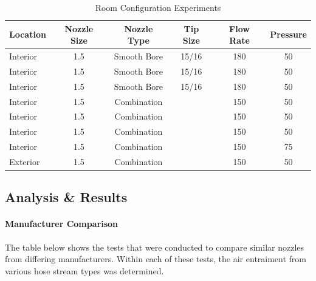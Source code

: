 \documentclass{article}
\begin{document}
\begin{table}[!ht]
\centering
\begin{tabular}{|lccccc|}
\hline
\multicolumn{1}{|c|}{\textbf{Location}} & \multicolumn{1}{c|}{\textbf{Nozzle Size}} & \multicolumn{1}{c|}{\textbf{Nozzle Type}} & \multicolumn{1}{c|}{\textbf{Tip Size}} & \multicolumn{1}{c|}{\textbf{Flow Rate}} & \textbf{Pressure} \\ \hline
Interior & 1.5 & Smooth Bore & 15/16 & 180 & 50 \\
Interior & 1.5 & Smooth Bore & 15/16 & 180 & 50 \\
Interior & 1.5 & Smooth Bore & 15/16 & 180 & 50 \\
Interior & 1.5 & Combination &  & 150 & 50 \\
Interior & 1.5 & Combination &  & 150 & 50 \\
Interior & 1.5 & Combination &  & 150 & 50 \\
Interior & 1.5 & Combination &  & 150 & 75 \\
Exterior & 1.5 & Combination &  & 150 & 50 \\ \hline
\end{tabular}
\caption{Room Configuration Experiments}
\label{Room_Configuration_Experiments}
\end{table}

\clearpage

\subsection{Analysis \& Results}

\vspace*{\baselineskip}

\paragraph{Manufacturer Comparison}

The table below shows the tests that were conducted to compare similar nozzles from differing manufacturers. Within each of these tests, the air entraiment from various hose stream types was determined.
\end{document}
